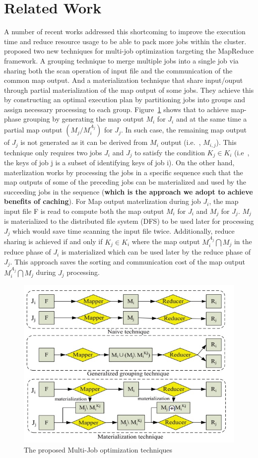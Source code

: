 \documentclass[conference]{sig-alternate-05-2015}
\begin{document}
\section{Related Work}
A number of recent works addressed this shortcoming to improve the execution time and reduce resource usage to be able to pack more jobs within the cluster. \cite{Wang:2013du} proposed two new techniques for multi-job optimization targeting the MapReduce framework. A grouping technique to merge multiple jobs into a single job via sharing both the scan operation of input file and the communication of the common map output. And a materialization technique that share input/ouput through partial materialization of the map output of some jobs. They achieve this by constructing an optimal execution plan by partitioning jobs into groups and assign necessary processing to each group. Figure~\ref{fig:multijob} shows that to achieve map-phase grouping by generating the map output $M_i$ for $J_i$ and at the same time a partial map output $(M_j/M_i^{A_j})$ for $J_j$. In such case, the remaining map output of $J_j$ is not generated as it can be derived from $M_i$ output (i.e.\ , $M_{i,j}$). This technique only  requires two jobs $J_i$ and $J_j$ to satisfy the condition $K_j \in K_i$ (i.e\ , the keys of job j is a subset of identifying keys of job i). On the other hand, materlization works by processing the jobs in a specific sequence such that the map outputs of some of the preceding jobs can be materialized and used by the succeeding jobs in the sequence (\textbf{which is the approach we adopt to achieve benefits of caching}). For Map output materlization during job $J_i$, the map input file F is read to compute both the map output $M_i$ for $J_i$ and $M_j$ for $J_j$. $M_j$ is materialized to the distributed file system (DFS) to be used later for processing $J_j$ which would save time scanning the input file twice. Additionally, reduce sharing is achieved if and only if $K_j \in K_i$ where the map output $M_i^{A_j} \bigcap M_j$ in the reduce phase of $J_i$ is materialized which can be used later by the reduce phase of $J_j$. This approach saves the sorting and communication cost of the map output $M_i^{A_j} \bigcap M_j$ during $J_j$ processing.

\begin{figure}[htbp]
	\centering
		\includegraphics[width=0.95\columnwidth]{images/2.jpeg}
	\caption{The proposed Multi-Job optimization techniques}
\label{fig:multijob}
\end{figure}



\end{document}
